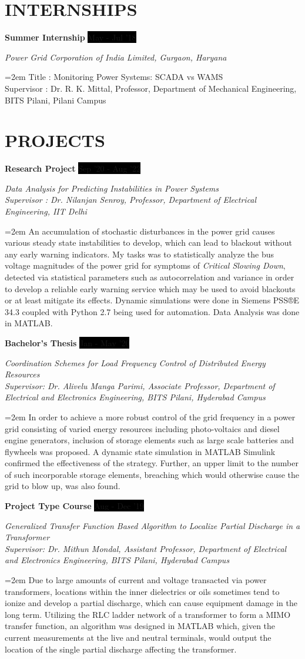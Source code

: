 \documentclass[paper=a4,fontsize=11pt]{scrartcl} %
\newcommand{\sepspace}{\vspace*{1em}}		%
\newcommand{\NewPart}[1]{\section*{\uppercase{#1}}}
\newcommand{\EducationEntry}[4]{
		\noindent \textbf{#1} \hfill      %
		\colorbox{Black}{%
			\parbox{10em}{%
			\hfill\color{White}#2}} \par  %
		\noindent \textit{#3} \par        %
		\noindent\hangindent=2em\hangafter=0 \small #4 %
		\normalsize \par}
\newcommand{\WorkEntry}[4]{				  %
		\noindent \textbf{#1} \hfill      %
		\colorbox{Black}{\color{White}#2} \par  %
		\noindent \textit{#3} \par              %
		\noindent\hangindent=2em\hangafter=0 \small #4 %
		\normalsize \par}
\begin{document}
\NewPart{Internships}{}

\WorkEntry{Summer Internship}{May - Jul '18}{Power Grid Corporation of India Limited, Gurgaon, Haryana}{Title : Monitoring Power Systems: SCADA vs WAMS\\Supervisor : Dr. R. K. Mittal, Professor, Department of Mechanical Engineering, BITS Pilani, Pilani Campus}

\NewPart{Projects}{}

\WorkEntry{Research Project}{Sep '20 - Aug '22}{Data Analysis for Predicting Instabilities in Power Systems\\ Supervisor : Dr. Nilanjan Senroy, Professor, Department of Electrical Engineering, IIT Delhi}{An accumulation of stochastic disturbances in the power grid causes various steady state instabilities to develop, which can lead to blackout without any early warning indicators. My tasks was to statistically analyze the bus voltage magnitudes of the power grid for symptoms of \textit{Critical Slowing Down}, detected via statistical parameters such as autocorrelation and variance in order to develop a reliable early warning service which may be used to avoid blackouts or at least mitigate its effects. Dynamic simulations were done in Siemens PSS®E 34.3 coupled with Python 2.7 being used for automation. Data Analysis was done in MATLAB.}
\sepspace


\WorkEntry{Bachelor's Thesis}{Jan - May '20}{Coordination Schemes for Load Frequency Control of Distributed Energy Resources\\ Supervisor: Dr. Alivelu Manga Parimi, Associate Professor, Department of Electrical and Electronics Engineering, BITS Pilani, Hyderabad Campus}{In order to achieve a more robust control of the grid frequency in a power grid consisting of varied energy resources including photo-voltaics and diesel engine generators, inclusion of storage elements such as large scale batteries and flywheels was proposed. A dynamic state simulation in MATLAB Simulink confirmed the effectiveness of the strategy. Further, an upper limit to the number of such incorporable storage elements, breaching which would otherwise cause the grid to blow up, was also found.}
\sepspace

\WorkEntry{Project Type Course}{Aug - Dec '19}{Generalized Transfer Function Based Algorithm to Localize Partial Discharge in a Transformer \\ Supervisor: Dr. Mithun Mondal, Assistant Professor, Department of Electrical and Electronics Engineering, BITS Pilani, Hyderabad Campus}{Due to large amounts of current and voltage transacted via power transformers, locations within the inner dielectrics or oils sometimes tend to ionize and develop a partial discharge, which can cause equipment damage in the long term. Utilizing the RLC ladder network of a transformer to form a MIMO transfer function, an algorithm was designed in MATLAB which, given the current measurements at the live and neutral terminals, would output the location of the single partial discharge affecting the transformer.}
\end{document}
